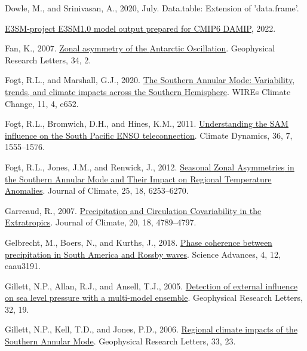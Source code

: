 \documentclass[12pt,oneside]{reedthesis}
\newlength{\cslhangindent}
\newenvironment{CSLReferences}[2] %
 {%
  \setlength{\parindent}{0pt}
  \ifodd #1 \everypar{\setlength{\hangindent}{\cslhangindent}}\ignorespaces\fi
  \ifnum #2 > 0
  \setlength{\parskip}{#2\baselineskip}
  \fi
 }%
 {}
\begin{document}
\begin{CSLReferences}{1}{0}
\leavevmode{}%
Dowle, M., and Srinivasan, A., 2020, July. Data.table: {Extension} of 'data.frame'.

\leavevmode{}%
\href{http://cera-www.dkrz.de/WDCC/meta/CMIP6/CMIP6.DAMIP.E3SM-Project.E3SM-1-0}{E3SM-project E3SM1.0 model output prepared for CMIP6 DAMIP}, 2022.

\leavevmode{}%
Fan, K., 2007. \href{https://doi.org/10.1029/2006GL028045}{Zonal asymmetry of the {Antarctic Oscillation}}. Geophysical Research Letters, 34, 2.

\leavevmode{}%
Fogt, R.L., and Marshall, G.J., 2020. \href{https://doi.org/10.1002/wcc.652}{The {Southern Annular Mode}: {Variability}, trends, and climate impacts across the {Southern Hemisphere}}. WIREs Climate Change, 11, 4, e652.

\leavevmode{}%
Fogt, R.L., Bromwich, D.H., and Hines, K.M., 2011. \href{https://doi.org/10.1007/s00382-010-0905-0}{Understanding the {SAM} influence on the {South Pacific ENSO} teleconnection}. Climate Dynamics, 36, 7, 1555--1576.

\leavevmode{}%
Fogt, R.L., Jones, J.M., and Renwick, J., 2012. \href{https://doi.org/10.1175/JCLI-D-11-00474.1}{Seasonal {Zonal Asymmetries} in the {Southern Annular Mode} and {Their Impact} on {Regional Temperature Anomalies}}. Journal of Climate, 25, 18, 6253--6270.

\leavevmode{}%
Garreaud, R., 2007. \href{https://doi.org/10.1175/JCLI4257.1}{Precipitation and {Circulation Covariability} in the {Extratropics}}. Journal of Climate, 20, 18, 4789--4797.

\leavevmode{}%
Gelbrecht, M., Boers, N., and Kurths, J., 2018. \href{https://doi.org/10.1126/sciadv.aau3191}{Phase coherence between precipitation in {South America} and {Rossby} waves}. Science Advances, 4, 12, eaau3191.

\leavevmode{}%
Gillett, N.P., Allan, R.J., and Ansell, T.J., 2005. \href{https://doi.org/10.1029/2005GL023640}{Detection of external influence on sea level pressure with a multi-model ensemble}. Geophysical Research Letters, 32, 19.

\leavevmode{}%
Gillett, N.P., Kell, T.D., and Jones, P.D., 2006. \href{https://doi.org/10.1029/2006GL027721}{Regional climate impacts of the {Southern Annular Mode}}. Geophysical Research Letters, 33, 23.


\end{CSLReferences}
\end{document}
